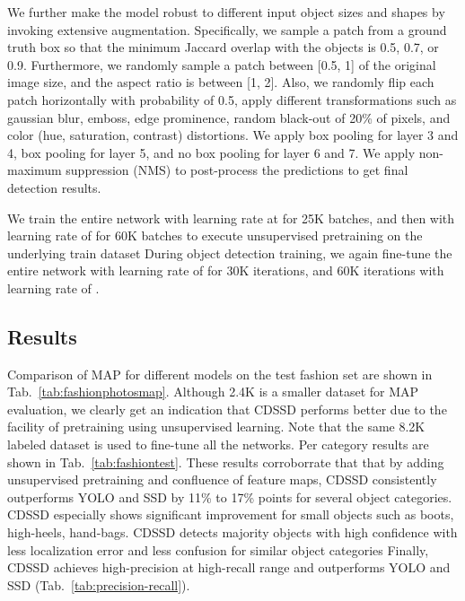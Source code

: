 \documentclass[sigconf]{acmart}
\begin{document}
We further make the model robust to different input object sizes and
shapes by invoking extensive augmentation.
Specifically, we sample a patch from a ground truth box so that the
minimum Jaccard overlap with the objects is 0.5, 0.7, or 0.9.
Furthermore, we randomly sample a patch between
[0.5, 1] of the original image size, and the aspect ratio
is between [1, 2].
Also, we randomly flip each patch horizontally with
probability of 0.5, apply different transformations such
as gaussian blur, emboss, edge prominence, random black-out of
20\% of pixels, and color (hue, saturation, contrast) distortions.
We apply  box pooling for layer 3 and 4,  box pooling
for layer 5, and no box pooling for layer 6 and 7.
We apply non-maximum suppression (NMS) 
to post-process the predictions to get final detection results.  


We train the entire network with learning rate at
 for 25K batches, and then
with learning rate of  for 60K batches to execute
unsupervised pretraining on the underlying train dataset
During object detection training,
we again fine-tune the entire network
with learning rate of 
for 30K iterations, and 60K iterations
with learning rate of .

\subsection{Results}
Comparison of MAP for different models
on the test fashion set are shown
in Tab.~\ref{tab:fashionphotosmap}.
Although 2.4K is a smaller dataset
for MAP evaluation, we clearly
get an indication that CDSSD performs
better due to the facility of pretraining
using unsupervised learning.
Note that the same 8.2K labeled dataset
is used to fine-tune all the networks.
Per category results 
are shown in Tab.~\ref{tab:fashiontest}.
These results corroborrate that
that by adding unsupervised pretraining
and confluence of feature maps, CDSSD
consistently outperforms YOLO and SSD
by 11\% to 17\% points
for several object categories.
CDSSD especially shows significant improvement
for small objects such as boots, high-heels, hand-bags.
CDSSD detects majority objects with high confidence
with less localization error and
less confusion for similar object categories
Finally, CDSSD achieves high-precision at high-recall range 
and outperforms YOLO and SSD (Tab.~\ref{tab:precision-recall}).
\end{document}
